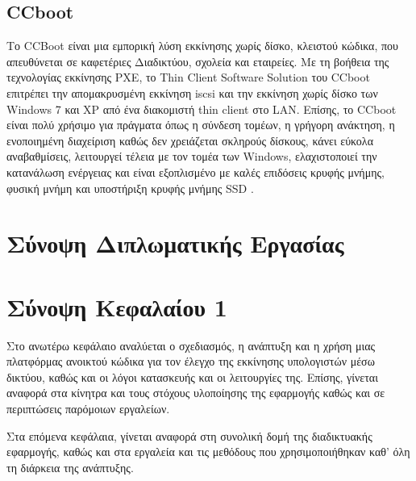 \subsection{CCboot}
Το CCBoot είναι μια εμπορική λύση εκκίνησης χωρίς δίσκο, κλειστού κώδικα, που απευθύνεται σε καφετέριες Διαδικτύου, σχολεία και εταιρείες.
Με τη βοήθεια της τεχνολογίας εκκίνησης PXE, το Thin Client Software Solution του CCboot επιτρέπει την απομακρυσμένη εκκίνηση iscsi και την εκκίνηση χωρίς δίσκο των Windows 7 και XP από ένα διακομιστή thin client στο LAN.
Επίσης, το CCboot είναι πολύ χρήσιμο για πράγματα όπως η σύνδεση τομέων, η γρήγορη ανάκτηση, η ενοποιημένη διαχείριση καθώς δεν χρειάζεται σκληρούς δίσκους, κάνει εύκολα αναβαθμίσεις, λειτουργεί τέλεια με τον τομέα των Windows, ελαχιστοποιεί την κατανάλωση ενέργειας και είναι εξοπλισμένο με καλές επιδόσεις κρυφής μνήμης, φυσική μνήμη και υποστήριξη κρυφής μνήμης SSD \cite{CCboot_2022}.

\section{Σύνοψη Διπλωματικής Εργασίας}

\section{Σύνοψη Κεφαλαίου 1}
Στο ανωτέρω κεφάλαιο αναλύεται ο σχεδιασμός, η ανάπτυξη και η χρήση μιας πλατφόρμας ανοικτού κώδικα για τον έλεγχο της εκκίνησης υπολογιστών μέσω δικτύου, καθώς και οι λόγοι κατασκευής και οι λειτουργίες της. Επίσης, γίνεται αναφορά στα κίνητρα και τους στόχους υλοποίησης της εφαρμογής καθώς και σε περιπτώσεις παρόμοιων εργαλείων.

Στα επόμενα κεφάλαια, γίνεται αναφορά στη συνολική δομή της διαδικτυακής εφαρμογής, καθώς και στα εργαλεία και τις μεθόδους που χρησιμοποιήθηκαν καθ' όλη τη διάρκεια της ανάπτυξης.
